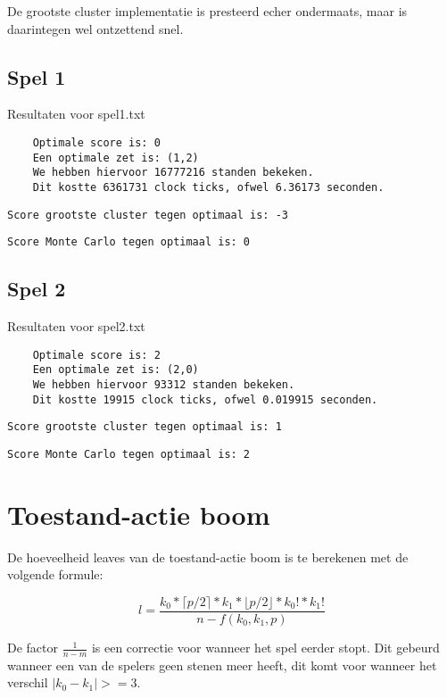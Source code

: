 \documentclass[10pt]{article}
\begin{document}
De grootste cluster implementatie is presteerd echer ondermaats, maar is daarintegen wel ontzettend snel.

\subsection{Spel 1}
Resultaten voor spel1.txt
\begin{verbatim}
    Optimale score is: 0
    Een optimale zet is: (1,2)
    We hebben hiervoor 16777216 standen bekeken.
    Dit kostte 6361731 clock ticks, ofwel 6.36173 seconden.
\end{verbatim}


\begin{verbatim}
Score grootste cluster tegen optimaal is: -3
\end{verbatim}

\begin{verbatim}
Score Monte Carlo tegen optimaal is: 0
\end{verbatim}

\subsection{Spel 2}
Resultaten voor spel2.txt
\begin{verbatim}
    Optimale score is: 2
    Een optimale zet is: (2,0)
    We hebben hiervoor 93312 standen bekeken.
    Dit kostte 19915 clock ticks, ofwel 0.019915 seconden.
\end{verbatim}


\begin{verbatim}
Score grootste cluster tegen optimaal is: 1
\end{verbatim}

\begin{verbatim}
Score Monte Carlo tegen optimaal is: 2
\end{verbatim}

\section{Toestand-actie boom}
De hoeveelheid leaves van de toestand-actie boom is te berekenen met de volgende formule:

\begin{equation}
    l = \frac{k_0 * \lceil p/2 \rceil * k_1 * \lfloor p/2 \rfloor * k_0! * k_1!}{n-f(k_0, k_1, p)} 
\end{equation}

De factor $\frac{1}{n - m}$ is een correctie voor wanneer het spel eerder stopt.
Dit gebeurd wanneer een van de spelers geen stenen meer heeft, dit komt voor wanneer het verschil $|k_0 -k_1| >= 3$.
\end{document}
